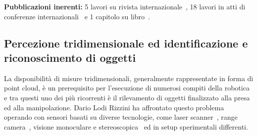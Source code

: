 \documentclass[11pt]{article}
\begin{document}
\begin{itemize}
\textbf{Pubblicazioni inerenti:}
5 lavori su rivista internazionale~\cite{lodirizzini2022ral,lodirizzini2019ral, lodirizzini2018pr, kallasi2016ral, lodirizzini2009ras},
18 lavori in atti di conferenze internazionali~\cite{
khan2022irc, khan2021iccp, lodirizzini2018irosws, lodirizzini2017iros, kallasi2016iros, lodirizzini2013ecmr, lodirizzini2011icra, lodirizzini2010iros, lodirizzini2009iros, lodirizzini2009ecmr, lodirizzini2009icar, grisetti2008icra, lodirizzini2008ciras, lodirizzini2007ecmr, lodirizzini2007icinco, khan2020irim, lodirizzini2012icraworkshop, lodirizzini2010graphbot} e 1 capitolo su libro~\cite{lodirizzini2008improved}.

\subsection*{Percezione tridimensionale ed identificazione e riconoscimento di oggetti}

La disponibilit\`a di misure tridimensionali, generalmente rappresentate in forma di point cloud, \`e un prerequisito per l'esecuzione 
di numerosi compiti della robotica e tra questi uno dei pi\`u ricorrenti \`e il rilevamento di oggetti finalizzato alla presa ed alla manipolazione. 
Dario Lodi Rizzini ha affrontato questo problema operando con sensori basati su diverse tecnologie, come laser scanner~\cite{aleotti2014jirs,aleotti2012icra},
range camera~\cite{aleotti2021ap, fontana2021ecmr, fontana2021iccp, monica2020irc, chiaravalli2020etfa, aleotti2014iros, lodirizzini2014ias}, visione monoculare e stereoscopica~\cite{lodirizzini2017caee, lodirizzini2015ijars,
oleari2014ifac, oleari2013iccp} ed in setup sperimentali differenti.


\end{itemize}
\end{document}
